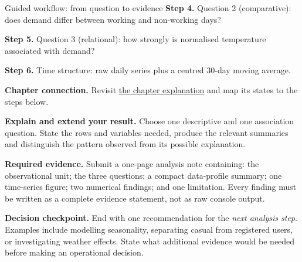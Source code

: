 \begin{labproject}{Guided workflow: from question to evidence}
\noindent\textbf{Step 4.} Question 2 (comparative): does demand differ between working and non-working days?


\noindent\textbf{Step 5.} Question 3 (relational): how strongly is normalised temperature associated with demand?


\noindent\textbf{Step 6.} Time structure: raw daily series plus a centred 30-day moving average.

\textbf{Chapter connection.} Revisit \hyperref[ch:workflow]{the chapter explanation} and map its states to the steps below.


\begin{verification}
\textbf{Explain and extend your result.} Choose one descriptive and one association question. State the rows and variables needed, produce the relevant summaries and distinguish the pattern observed from its possible explanation.


\textbf{Required evidence.} Submit a one-page analysis note containing: the observational unit; the three questions; a compact data-profile summary; one time-series figure; two numerical findings; and one limitation. Every finding must be written as a complete evidence statement, not as raw console output.

\textbf{Decision checkpoint.} End with one recommendation for the \emph{next analysis step}. Examples include modelling seasonality, separating casual from registered users, or investigating weather effects. State what additional evidence would be needed before making an operational decision.
\end{verification}
\end{labproject}
